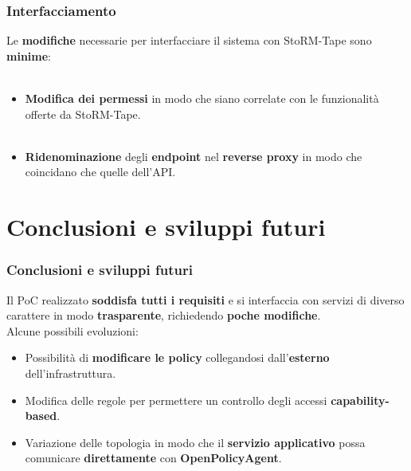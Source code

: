 \documentclass{beamer}
\begin{document}
\begin{frame}
  \frametitle{Interfacciamento}
   Le \textbf{modifiche} necessarie per interfacciare il sistema con StoRM-Tape sono \textbf{minime}: \\~\
  \begin{itemize}
    \item \textbf{Modifica dei permessi} in modo che siano correlate con le funzionalità offerte da StoRM-Tape. \\~\
    \item \textbf{Ridenominazione} degli \textbf{endpoint} nel \textbf{reverse proxy} in modo che coincidano che quelle dell'API. 
  \end{itemize}
\end{frame}



\section[Conclusioni]{Conclusioni e sviluppi futuri}
\begin{frame}
  \frametitle{Conclusioni e sviluppi futuri}
  Il PoC realizzato \textbf{soddisfa tutti i requisiti} e si interfaccia con servizi di diverso carattere in modo \textbf{trasparente}, richiedendo \textbf{poche modifiche}. 
  \\ Alcune possibili evoluzioni:
\begin{itemize}
  \item Possibilità di \textbf{modificare le policy} collegandosi dall'\textbf{esterno} dell'infrastruttura.
  \item Modifica delle regole per permettere un controllo degli accessi \textbf{capability-based}.
  \item Variazione delle topologia in modo che il \textbf{servizio applicativo} possa comunicare \textbf{direttamente} con \textbf{OpenPolicyAgent}. 
\end{itemize}
\end{frame}
\end{document}
